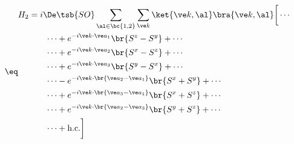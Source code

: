 \documentclass{article}
\begin{document}
\begin{align*}
\eq \label{eq:diamond_H2_computed_cross_product_ft}
\begin{split}
H_2
&= i \De\tsb{SO}\sum_{\al \in \bc{1,2}}\sum_{\ve k} \ket{\ve k,\al} \bra{\ve k, \al} \bigg[\cdots \\
&\qquad \cdots + e^{-i \ve k \cdot \ve a_1} \br{S^z - S^y} + \cdots \\
&\qquad \cdots + e^{-i \ve k \cdot \ve a_2} \br{S^x - S^z} + \cdots \\
&\qquad \cdots + e^{-i \ve k \cdot \ve a_3} \br{S^y - S^x} + \cdots \\
&\qquad \cdots - e^{-i \ve k \cdot \br{\ve a_2 - \ve a_1}} \br{S^x + S^y} + \cdots \\
&\qquad \cdots + e^{-i \ve k \cdot \br{\ve a_3 - \ve a_1}} \br{S^x + S^z} + \cdots \\
&\qquad \cdots + e^{-i \ve k \cdot \br{\ve a_2 - \ve a_3}} \br{S^y + S^z} + \cdots \\
&\qquad \cdots + \text{h.c.} \bigg]
\end{split}
\end{align*}
\end{document}
